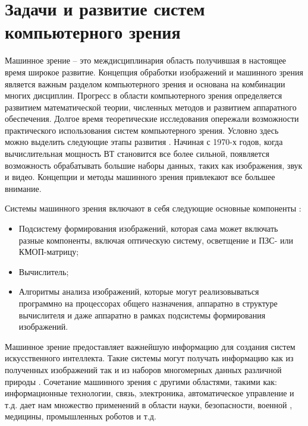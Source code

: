 \section{Задачи и развитие систем компьютерного зрения} \label{chapter1.1}

Машинное зрение – это междисциплинария область получившая в настоящее время широкое развитие. Концепция обработки изображений и машинного зрения является важным разделом компьютерного зрения и основана на комбинации многих дисциплин. Прогресс в области компьютерного зрения определяется развитием математической теории, численных методов и развитием аппаратного обеспечения. Долгое время теоретические исследования опережали возможности практического использования систем компьютерного зрения. Условно здесь можно выделить следующие этапы  развития \cite{Paragios2008}. Начиная с 1970-х годов, когда вычислительная мощность ВТ становится все более сильной, появляется возможность обрабатывать большие наборы данных, таких как изображения, звук и видео. Концепции и методы машинного зрения привлекают все большее внимание.

Системы машинного зрения включают в себя следующие основные компоненты \cite{Rosenfeld2000}: 

\begin{itemize}
	\item Подсистему формирования изображений, которая сама может включать разные компоненты, включая оптическую систему, осветщение и ПЗС- или КМОП-матрицу;
	\item Вычислитель;
	\item Алгоритмы анализа изображений, которые могут реализовываться программно на процессорах общего назначения, аппаратно в структуре вычислителя и даже аппаратно в рамках подсистемы формирования изображений.
\end{itemize}

Машинное зрение предоставляет важнейшую информацию для создания систем искусственного интеллекта. Такие системы могут получать информацию как из полученных  изображений так и из наборов многомерных данных различной природы \cite{Fan2013}. Сочетание машинного зрения с другими областями, такими как: информационные технологии, связь, электроника, автоматическое управление и т.д. дает нам множество применений в области науки, безопасности, военной , медицины, промышленных роботов и т.д.



